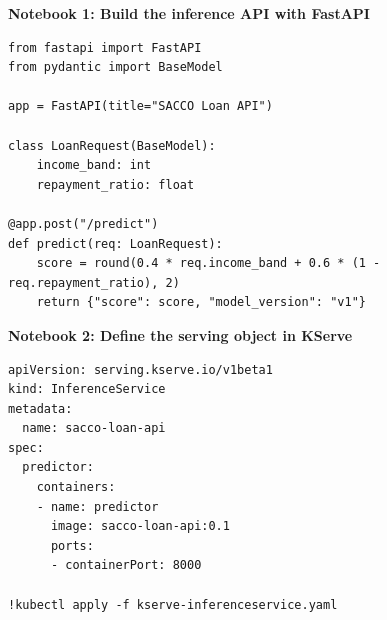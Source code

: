 \documentclass[12pt,a4paper]{article}
\begin{document}
\textbf{Notebook 1: Build the inference API with FastAPI}
\begin{verbatim}
from fastapi import FastAPI 
from pydantic import BaseModel 

app = FastAPI(title="SACCO Loan API") 

class LoanRequest(BaseModel): 
    income_band: int 
    repayment_ratio: float 

@app.post("/predict") 
def predict(req: LoanRequest): 
    score = round(0.4 * req.income_band + 0.6 * (1 - req.repayment_ratio), 2) 
    return {"score": score, "model_version": "v1"}
\end{verbatim}

\textbf{Notebook 2: Define the serving object in KServe}
\begin{verbatim}
apiVersion: serving.kserve.io/v1beta1 
kind: InferenceService 
metadata: 
  name: sacco-loan-api 
spec: 
  predictor: 
    containers: 
    - name: predictor 
      image: sacco-loan-api:0.1 
      ports: 
      - containerPort: 8000 

!kubectl apply -f kserve-inferenceservice.yaml
\end{verbatim}
\end{document}
